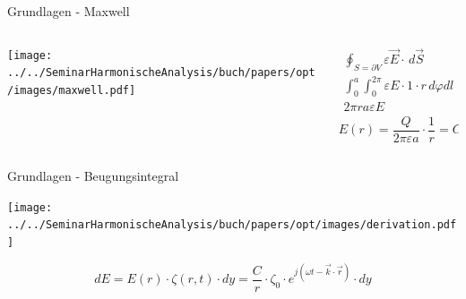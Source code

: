 \documentclass{beamer}
\begin{document}
\begin{frame}{Grundlagen - Maxwell}
    \begin{columns}
        \begin{column}{0.5\textwidth}
            \begin{center}
                \texttt{[image: ../../SeminarHarmonischeAnalysis/buch/papers/opt/images/maxwell.pdf]}
            \end{center}
        \end{column}

        \begin{column}{0.5\textwidth}
            \pause
            \begin{align*}
                \oint_{S=\partial V} \varepsilon\vec{E} \cdot\, d\vec{S}
                &=
                \int_{V}\rho\, dV
                \\
                \int_{0}^{a}\int_{0}^{2\pi} \varepsilon E\cdot 1 \cdot r\, d\varphi dl
                &=
                Q
                \\
                2\pi ra\varepsilon E
                &=
                Q
            \end{align*}
            \pause
            \begin{equation*}
                E(r)
                =
                \frac{Q}{2\pi\varepsilon a} \cdot \frac{1}{r}
                =
                C \cdot \frac{1}{r}
            \end{equation*}
        \end{column}
    \end{columns}
\end{frame}

\begin{frame}{Grundlagen - Beugungsintegral}
    \begin{center}
        \texttt{[image: ../../SeminarHarmonischeAnalysis/buch/papers/opt/images/derivation.pdf]}
    \end{center}
    \begin{equation}
        dE
        =
        E(r) \cdot \zeta(r, t) \cdot dy
        =
        \frac{C}{r} \cdot \zeta_0 \cdot e^{j(\omega t - \vec{k}\cdot\vec{r})} \cdot dy
    \end{equation}
\end{frame}
\end{document}
